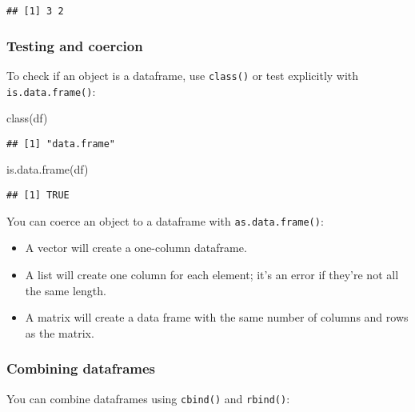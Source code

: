 \documentclass[
]{book}
\newenvironment{Shaded}{\begin{snugshade}}{\end{snugshade}}
\newcommand{\FunctionTok}[1]{\textcolor[rgb]{0.00,0.00,0.00}{#1}}
\newcommand{\NormalTok}[1]{#1}
\begin{document}
\begin{verbatim}
## [1] 3 2
\end{verbatim}

\hypertarget{testing-and-coercion}{%
\subsubsection{Testing and coercion}\label{testing-and-coercion}}

To check if an object is a dataframe, use \texttt{class()} or test explicitly with \texttt{is.data.frame()}:

\begin{Shaded}
\begin{Highlighting}[]
\FunctionTok{class}\NormalTok{(df)}
\end{Highlighting}
\end{Shaded}

\begin{verbatim}
## [1] "data.frame"
\end{verbatim}

\begin{Shaded}
\begin{Highlighting}[]
\FunctionTok{is.data.frame}\NormalTok{(df)}
\end{Highlighting}
\end{Shaded}

\begin{verbatim}
## [1] TRUE
\end{verbatim}

You can coerce an object to a dataframe with \texttt{as.data.frame()}:

\begin{itemize}
\item
  A vector will create a one-column dataframe.
\item
  A list will create one column for each element; it's an error if they're
  not all the same length.
\item
  A matrix will create a data frame with the same number of columns and rows as the matrix.
\end{itemize}

\hypertarget{combining-dataframes}{%
\subsubsection{Combining dataframes}\label{combining-dataframes}}

You can combine dataframes using \texttt{cbind()} and \texttt{rbind()}:
\end{document}
